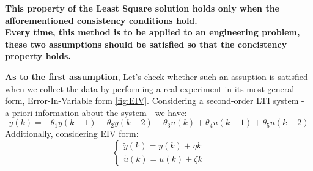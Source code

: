 \begin{QandAbox}
\textbf{This property of the Least Square solution holds only when the afforementioned consistency conditions hold.\\
Every time, this method is to be applied to an engineering problem, these two assumptions should be satisfied so that the concistency property holds.
}\end{QandAbox} \vspace{0.5cm}

\textbf{As to the first assumption}, Let's check whether such an assuption is satisfied when we collect the data by performing a real experiment in its most general form, Error-In-Variable form \ref{fig:EIV}. Considering a second-order LTI system - a-priori information about the system - we have:
\[
y(k) = -\theta_1 y(k - 1) - \theta_2 y(k - 2) + \theta_3 u(k) + \theta_4 u(k - 1) + \theta_5 u(k - 2)
\]
Additionally, considering EIV form:
\[
\begin{cases}
    \tilde{y}(k) = y(k) + \eta{k}\\
    \tilde{u}(k) = u(k) + \zeta{k}
\end{cases}
\]

